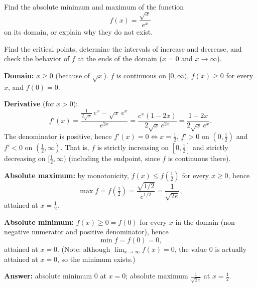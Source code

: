 
\begin{question}
Find the absolute minimum and maximum of the function
\[ f(x) = \frac{\sqrt{x}}{e^x} \]
on its domain, or explain why they do not exist.
\end{question}

\begin{hint}
Find the critical points, determine the intervals of increase and decrease, and check the behavior of $f$ at the ends of the domain ($x = 0$ and $x \to \infty$).
\end{hint}

\begin{solution}
\textbf{Domain:} $x \ge 0$ (because of $\sqrt{x}$). $f$ is continuous on $[0,\infty)$, $f(x) \ge 0$ for every $x$, and $f(0) = 0$.

\textbf{Derivative} (for $x > 0$):
\[ f'(x) = \frac{\frac{1}{2\sqrt{x}}\, e^x - \sqrt{x}\, e^x}{e^{2x}} = \frac{e^x(1 - 2x)}{2\sqrt{x}\, e^{2x}} = \frac{1 - 2x}{2\sqrt{x}\, e^x}. \]
The denominator is positive, hence $f'(x) = 0 \iff x = \frac12$, $f' > 0$ on $(0, \frac12)$ and $f' < 0$ on $(\frac12, \infty)$.
That is, $f$ is strictly increasing on $[0, \frac12]$ and strictly decreasing on $[\frac12, \infty)$ (including the endpoint, since $f$ is continuous there).

\textbf{Absolute maximum:} by monotonicity, $f(x) \le f(\frac12)$ for every $x \ge 0$, hence
\[ \max f = f\left(\tfrac12\right) = \frac{\sqrt{1/2}}{e^{1/2}} = \frac{1}{\sqrt{2e}}, \]
attained at $x = \frac12$.

\textbf{Absolute minimum:} $f(x) \ge 0 = f(0)$ for every $x$ in the domain (non-negative numerator and positive denominator), hence
\[ \min f = f(0) = 0, \]
attained at $x = 0$. (Note: although $\lim_{x\to\infty} f(x) = 0$, the value $0$ is actually attained at $x = 0$, so the minimum exists.)

\textbf{Answer:} absolute minimum $0$ at $x = 0$; absolute maximum $\frac{1}{\sqrt{2e}}$ at $x = \frac12$.
\end{solution}
